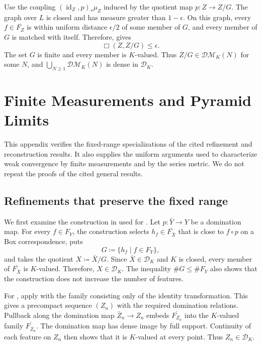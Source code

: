 \documentclass[11pt]{amsart}
\theoremstyle{plain}
\theoremstyle{definition}
\theoremstyle{remark}
\newcommand{\DK}{\mathcal D_K}
\newcommand{\DM}{\mathcal{DM}}
\begin{document}
Use the coupling $(\operatorname{id}_Z,p)_*\mu_Z$ induced by the quotient map $p\colon Z\to Z/G$. The graph over $L$ is closed and has measure greater than $1-\epsilon$. On this graph, every $f\in\overline{F_Z}$ is within uniform distance $\epsilon/2$ of some member of $G$, and every member of $G$ is matched with itself. Therefore,  gives
\[
\Box(Z,Z/G)\leq\epsilon.
\]
The set $G$ is finite and every member is $K$-valued. Thus $Z/G\in\DM_K(N)$ for some $N$, and $\bigcup_{N\geq1}\DM_K(N)$ is dense in $\DK$.

\section{Finite Measurements and Pyramid Limits}
\label{app:pyramid-technical}

This appendix verifies the fixed-range specializations of the cited refinement and reconstruction results. It also supplies the uniform arguments used to characterize weak convergence by finite measurements and by the series metric. We do not repeat the proofs of the cited general results.

\subsection{Refinements that preserve the fixed range}
\label{subsec:app-K-refinement}

We first examine the construction in \cite[Lemma~5.4]{gds2} used for . Let $p\colon\bar Y\to Y$ be a domination map. For every $f\in F_Y$, the construction selects $h_f\in\overline{F_{\bar X}}$ that is close to $f\circ p$ on a Box correspondence, puts
\[
G\coloneqq\{h_f\mid f\in F_Y\},
\]
and takes the quotient $X\coloneqq\bar X/G$. Since $\bar X\in\DK$ and $K$ is closed, every member of $\overline{F_{\bar X}}$ is $K$-valued. Therefore, $X\in\DK$. The inequality $\#G\leq\#F_Y$ also shows that the construction does not increase the number of features.

For , apply \cite[Lemma~5.6]{gds2} with the family consisting only of the identity transformation. This gives a precompact sequence $(Z_n)$ with the required domination relations. Pullback along the domination map $\bar Z_n\to Z_n$ embeds $\overline{F_{Z_n}}$ into the $K$-valued family $\overline{F_{\bar Z_n}}$. The domination map has dense image by full support. Continuity of each feature on $Z_n$ then shows that it is $K$-valued at every point. Thus $Z_n\in\DK$.
\end{document}
